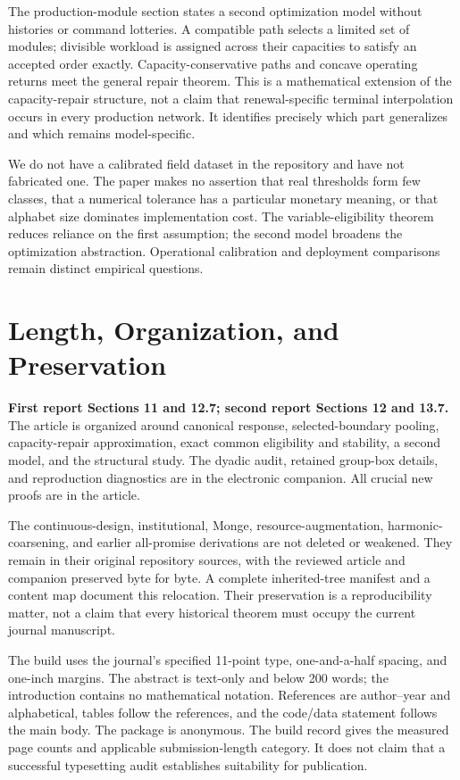 The production-module section states a second optimization model without histories or command lotteries. A compatible path selects a limited set of modules; divisible workload is assigned across their capacities to satisfy an accepted order exactly. Capacity-conservative paths and concave operating returns meet the general repair theorem. This is a mathematical extension of the capacity-repair structure, not a claim that renewal-specific terminal interpolation occurs in every production network. It identifies precisely which part generalizes and which remains model-specific.

We do not have a calibrated field dataset in the repository and have not fabricated one. The paper makes no assertion that real thresholds form few classes, that a numerical tolerance has a particular monetary meaning, or that alphabet size dominates implementation cost. The variable-eligibility theorem reduces reliance on the first assumption; the second model broadens the optimization abstraction. Operational calibration and deployment comparisons remain distinct empirical questions.

\section{Length, Organization, and Preservation}
\textbf{First report Sections 11 and 12.7; second report Sections 12 and 13.7.}
The article is organized around canonical response, selected-boundary pooling, capacity-repair approximation, exact common eligibility and stability, a second model, and the structural study. The dyadic audit, retained group-box details, and reproduction diagnostics are in the electronic companion. All crucial new proofs are in the article.

The continuous-design, institutional, Monge, resource-augmentation, harmonic-coarsening, and earlier all-promise derivations are not deleted or weakened. They remain in their original repository sources, with the reviewed article and companion preserved byte for byte. A complete inherited-tree manifest and a content map document this relocation. Their preservation is a reproducibility matter, not a claim that every historical theorem must occupy the current journal manuscript.

The build uses the journal's specified 11-point type, one-and-a-half spacing, and one-inch margins. The abstract is text-only and below 200 words; the introduction contains no mathematical notation. References are author--year and alphabetical, tables follow the references, and the code/data statement follows the main body. The package is anonymous. The build record gives the measured page counts and applicable submission-length category. It does not claim that a successful typesetting audit establishes suitability for publication.

